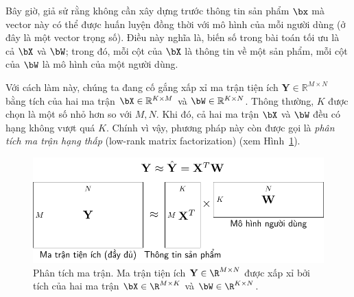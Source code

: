 Bây giờ, giả sử rằng không cần xây dựng trước thông tin sản phẩm
$\bx$ mà vector này có thể được huấn luyện đồng thời với mô hình của mỗi người dùng (ở đây là một vector trọng số). Điều này nghĩa là, biến số trong bài toán tối ưu là cả
$\bX$ và $\bW$; trong đó,
mỗi cột của $\bX$ là thông tin về một sản phẩm, mỗi cột của $\bW$ là mô hình của một người dùng. 

 
Với cách làm này, chúng ta đang cố gắng xấp xỉ ma trận tiện ích $\mathbf{Y} \in
\mathbb{R}^{M \times N}$ bằng tích của hai ma trận $\bX\in
\mathbb{R}^{K\times M}$ và $\bW \in \mathbb{R}^{K \times N}$. Thông
thường, $K$ được chọn là một số nhỏ hơn so với $M, N$. Khi đó, cả hai
ma trận $\bX$ và $\bW$ đều có hạng không vượt quá $K$. Chính vì
vậy, phương pháp này còn được gọi là \textit{phân tích ma trận hạng thấp} ({low-rank matrix factorization}) (xem
Hình~\ref{fig:25_1}).
\begin{figure}[t]
\centering
    \includegraphics[width = .7\textwidth]{Chapters/06_RecommendationSystems/25_mf/latex/mf1.pdf}
    \caption[]{Phân tích ma trận. Ma trận tiện ích $\mathbf{Y} \in
    \R^{M\times N}$ được
    xấp xỉ bởi tích của hai ma trận $\bX \in \R^{M\times K}$ và
    $\bW \in \R^{K\times N}$.}
    \label{fig:25_1}
\end{figure}
 
